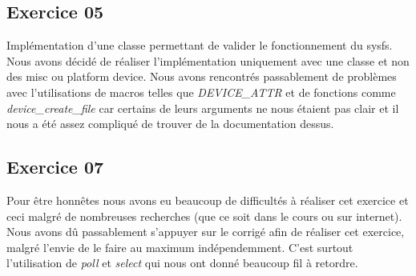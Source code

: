 \documentclass{ReportTemplate}
\begin{document}
\subsection{Exercice 05}
Implémentation d'une classe permettant de valider le fonctionnement du sysfs. 
Nous avons décidé de réaliser l'implémentation uniquement avec une classe et non
des misc ou platform device. Nous avons rencontrés passablement de problèmes
avec l'utilisations de macros telles que \textit{DEVICE\_ATTR} et de fonctions
comme \textit{device\_create\_file} car certains de leurs arguments ne nous
étaient pas clair et il nous a été assez compliqué de trouver de la
documentation dessus.
\subsection{Exercice 07}
Pour être honnêtes nous avons eu beaucoup de difficultés à réaliser cet exercice
et ceci malgré de nombreuses recherches (que ce soit dans le cours ou sur
internet). Nous avons dû passablement s'appuyer sur le corrigé afin de réaliser
cet exercice, malgré l'envie de le faire au maximum indépendemment. C'est
surtout l'utilisation de \textit{poll} et \textit{select} qui nous ont donné
beaucoup fil à retordre.
\end{document}
